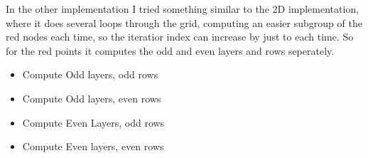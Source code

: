 	In the other implementation I tried something similar to the 2D implementation, where it does several
	loops through the grid, computing an easier subgroup of the red nodes each time, so the iteratior index
	can increase by just to each time. So for the red points it computes the odd and even layers and rows seperately.

	\begin{itemize}
		\item Compute Odd layers, odd rows
		\item Compute Odd layers, even rows
		\item Compute Even Layers, odd rows
		\item Compute Even layers, even rows
	\end{itemize}





